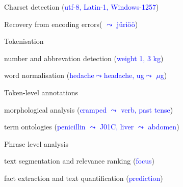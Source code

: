 \documentclass[landscape,footrule]{foils}
\begin{document}
\begin{minipage}[b]{17cm}
\begin{triangles}
\item Charset detection (\textcolor{blue}{utf-8, Latin-1, Windows-1257})
\item Recovery from encoding errors(\textcolor{blue}{\hspace*{-0.2ex} $\leadsto$ j\"uri\"o\"o}) 
\end{triangles}\vspace*{3ex}
Tokenisation
\begin{triangles}
\item number and abbrevation detection (\textcolor{blue}{weight 1, 3 kg})
\item word normalisation (\textcolor{blue}{hedache$\leadsto$headache, ug$\leadsto$ $\mu$g})
\end{triangles}\vspace*{3ex}

Token-level annotations 

\begin{triangles}
\item morphological analysis (\textcolor{blue}{cramped $\leadsto$ verb, past tense})
\item term ontologies (\textcolor{blue}{penicillin $\leadsto$ J01C, liver $\leadsto$ abdomen})
\end{triangles}
\vspace*{3ex}
Phrase level analysis
\begin{triangles}
\item text segmentation and relevance ranking (\textcolor{blue}{focus})
\item fact extraction and text quantification (\textcolor{blue}{prediction})
\end{triangles}
\end{minipage}

\enlargethispage{1cm}
\end{document}
